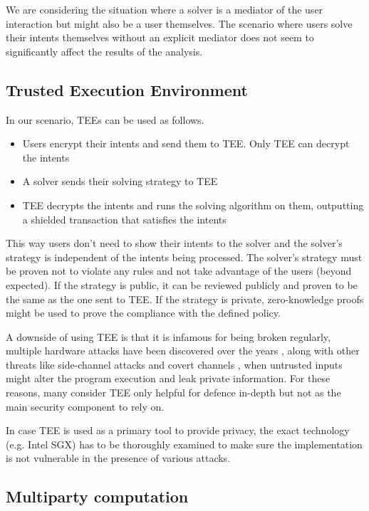 \documentclass[
    9pt,            %
    report,        %
    affiltop,       %
]{art}
\begin{document}
We are considering the situation where a solver is a mediator of the user interaction but might also be a user themselves. The scenario where users solve their intents themselves without an explicit mediator does not seem to significantly affect the results of the analysis.

\subsection{Trusted Execution Environment}

In our scenario, TEEs can be used as follows.
\begin{itemize}
    \item Users encrypt their intents and send them to TEE. Only TEE can decrypt the intents
    \item A solver sends their solving strategy to TEE
    \item TEE decrypts the intents and runs the solving algorithm on them, outputting a shielded transaction that satisfies the intents
\end{itemize}

This way users don't need to show their intents to the solver and the solver's strategy is independent of the intents being processed. The solver's strategy must be proven not to violate any rules and not take advantage of the users (beyond expected). If the strategy is public, it can be reviewed publicly and proven to be the same as the one sent to TEE. If the strategy is private, zero-knowledge proofs might be used to prove the compliance with the defined policy.

\hfill

A downside of using TEE is that it is infamous for being broken regularly, multiple hardware attacks have been discovered over the years \cite{sgxfail} \cite{downfall}, along with other threats like side-channel attacks and covert channels \cite{flash}, when untrusted inputs might alter the program execution and leak private information. For these reasons, many consider TEE only helpful for defence in-depth but not as the main security component to rely on.

In case TEE is used as a primary tool to provide privacy, the exact technology (e.g. Intel SGX) has to be thoroughly examined to make sure the implementation is not vulnerable in the presence of various attacks.

\subsection{Multiparty computation}
\end{document}
